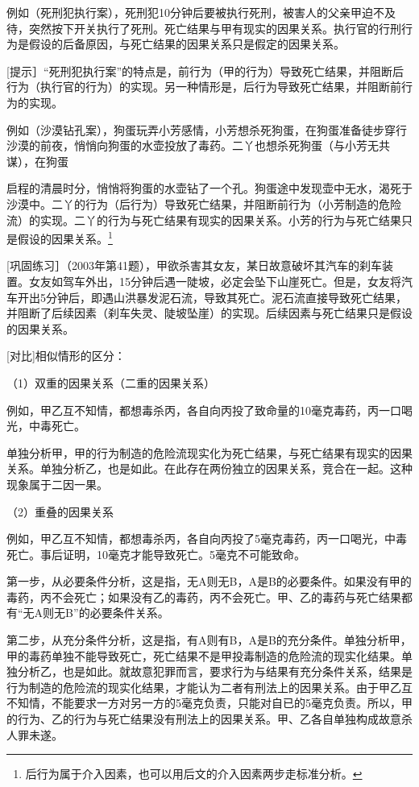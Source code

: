 例如（死刑犯执行案），死刑犯10分钟后要被执行死刑，被害人的父亲甲迫不及待，突然按下开关执行了死刑。死亡结果与甲有现实的因果关系。执行官的行刑行为是假设的后备原因，与死亡结果的因果关系只是假定的因果关系。

[提示］“死刑犯执行案”的特点是，前行为（甲的行为）导致死亡结果，并阻断后行为（执行官的行为）的实现。另一种情形是，后行为导致死亡结果，并阻断前行为的实现。

例如（沙漠钻孔案），狗蛋玩弄小芳感情，小芳想杀死狗蛋，在狗蛋准备徒步穿行沙漠的前夜，悄悄向狗蛋的水壶投放了毒药。二丫也想杀死狗蛋（与小芳无共谋），在狗蛋

启程的清晨时分，悄悄将狗蛋的水壶钻了一个孔。狗蛋途中发现壶中无水，渴死于沙漠中。二丫的行为（后行为）导致死亡结果，并阻断前行为（小芳制造的危险流）的实现。二丫的行为与死亡结果有现实的因果关系。小芳的行为与死亡结果只是假设的因果关系。\footnote{后行为属于介入因素，也可以用后文的介入因素两步走标准分析。}

[巩固练习］（2003年第41题），甲欲杀害其女友，某日故意破坏其汽车的刹车装置。女友如驾车外出，15分钟后遇一陡坡，必定会坠下山崖死亡。但是，女友将汽车开出5分钟后，即遇山洪暴发泥石流，导致其死亡。泥石流直接导致死亡结果，并阻断了后续因素（刹车失灵、陡坡坠崖）的实现。后续因素与死亡结果只是假设的因果关系。

[对比]相似情形的区分：

（1）双重的因果关系（二重的因果关系）

例如，甲乙互不知情，都想毒杀丙，各自向丙投了致命量的10毫克毒药，丙一口喝光，中毒死亡。


单独分析甲，甲的行为制造的危险流现实化为死亡结果，与死亡结果有现实的因果关系。单独分析乙，也是如此。在此存在两份独立的因果关系，竞合在一起。这种现象属于二因一果。

（2）重叠的因果关系

例如，甲乙互不知情，都想毒杀丙，各自向丙投了5毫克毒药，丙一口喝光，中毒死亡。事后证明，10毫克才能导致死亡。5毫克不可能致命。


第一步，从必要条件分析，这是指，无A则无B，A是B的必要条件。如果没有甲的毒药，丙不会死亡；如果没有乙的毒药，丙不会死亡。甲、乙的毒药与死亡结果都有“无A则无B”的必要条件关系。

第二步，从充分条件分析，这是指，有A则有B，A是B的充分条件。单独分析甲，甲的毒药单独不能导致死亡，死亡结果不是甲投毒制造的危险流的现实化结果。单独分析乙，也是如此。就故意犯罪而言，要求行为与结果有充分条件关系，结果是行为制造的危险流的现实化结果，才能认为二者有刑法上的因果关系。由于甲乙互不知情，不能要求一方对另一方的5毫克负责，只能对自已的5毫克负责。所以，甲的行为、乙的行为与死亡结果没有刑法上的因果关系。甲、乙各自单独构成故意杀人罪未遂。


